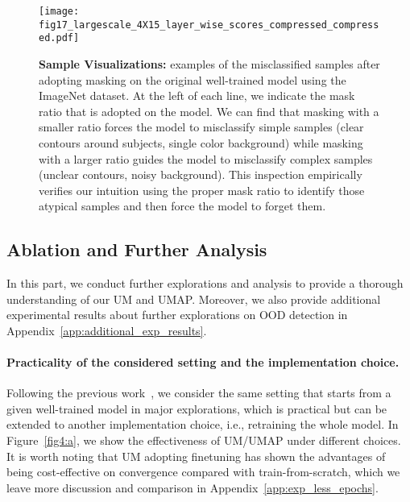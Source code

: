 \documentclass{article}
\theoremstyle{plain}
\theoremstyle{definition}
\theoremstyle{remark}
\begin{document}
\begin{figure*}[t!]
    \begin{center}
    \vspace{2mm}
    \texttt{[image: fig17\_largescale\_4X15\_layer\_wise\_scores\_compressed\_compressed.pdf]}
    \end{center}
    \vspace{-2mm}
    \caption{\textbf{Sample Visualizations:} examples of the misclassified samples after adopting masking on the original well-trained model using the ImageNet dataset. At the left of each line, we indicate the mask ratio that is adopted on the model. We can find that masking with a smaller ratio forces the model to misclassify simple samples (clear contours around subjects, single color background) while masking with a larger ratio guides the model to misclassify complex samples (unclear contours, noisy background). This inspection empirically verifies our intuition using the proper mask ratio to identify those atypical samples and then force the model to forget them.
}
    \label{fig:sample_vis}
\end{figure*}






\subsection{Ablation and Further Analysis}
\label{sec:exp_part3}

In this part, we conduct further explorations and analysis to provide a thorough understanding of our UM and UMAP. Moreover, we also provide additional experimental results about further explorations on OOD detection in Appendix~\ref{app:additional_exp_results}.




\paragraph{Practicality of the considered setting and the implementation choice.} Following the previous work~\citep{liu2020energy,hendrycks2018deep}, we consider the same setting that starts from a given well-trained model in major explorations, which is practical but can be extended to another implementation choice, i.e., retraining the whole model. In Figure~\ref{fig4:a}, we show the effectiveness of UM/UMAP under different choices. It is worth noting that UM adopting finetuning has shown the advantages of being cost-effective on convergence compared with train-from-scratch, which we leave more discussion and comparison in Appendix~\ref{app:exp_less_epochs}. 
\end{document}
